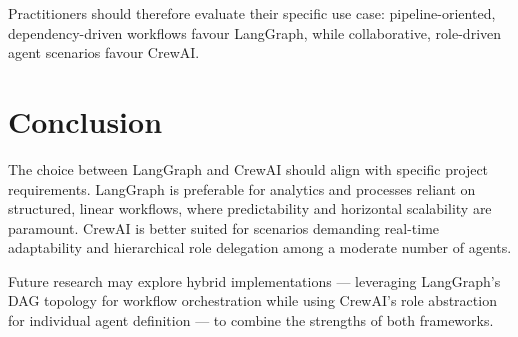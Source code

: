 \documentclass[12pt,a4paper]{article}
\begin{document}
Practitioners should therefore evaluate their specific use case:
pipeline-oriented, dependency-driven workflows favour LangGraph, while
collaborative, role-driven agent scenarios favour CrewAI.

\section{Conclusion}

The choice between LangGraph and CrewAI should align with specific project
requirements. LangGraph is preferable for analytics and processes reliant on
structured, linear workflows, where predictability and horizontal scalability
are paramount. CrewAI is better suited for scenarios demanding real-time
adaptability and hierarchical role delegation among a moderate number of agents.

Future research may explore hybrid implementations — leveraging LangGraph's
DAG topology for workflow orchestration while using CrewAI's role abstraction
for individual agent definition — to combine the strengths of both frameworks.

\newpage


\end{document}
